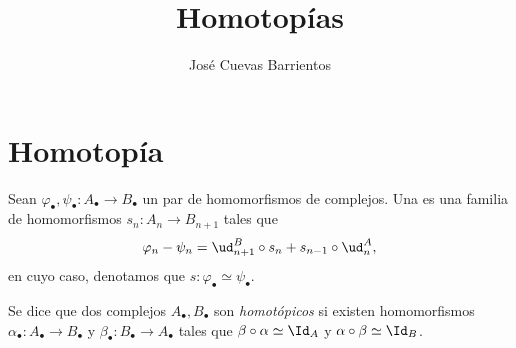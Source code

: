 \documentclass[11pt, reqno]{amsart}
\title{Homotopías}
\date{\DTMdate{2026-08-27}}
\author{José Cuevas Barrientos}
\begin{document}
\maketitle

\section{Homotopía}
\begin{mydef}
	Sean $\varphi_\bullet, \psi_\bullet \colon A_\bullet \to B_\bullet$ un par de homomorfismos de complejos.
	Una  es una familia de homomorfismos $s_n \colon A_n \to B_{n+1}$ tales que
	\[
		\varphi_n - \psi_n = \ud^B_{n+1}\circ s_n + s_{n-1}\circ \ud^A_n,
	\]
	en cuyo caso, denotamos que $s \colon \varphi_\bullet \simeq \psi_\bullet$.

	Se dice que dos complejos $A_\bullet, B_\bullet$ son \emph{homotópicos} si existen homomorfismos $\alpha_\bullet \colon A_\bullet
	\to B_\bullet$ y $\beta_\bullet \colon B_\bullet \to A_\bullet$ tales que $\beta\circ\alpha \simeq \Id_A$ y $\alpha\circ\beta \simeq
	\Id_B$.
\end{mydef}
\end{document}
